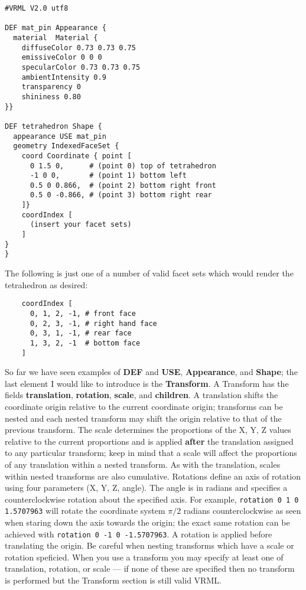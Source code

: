 \documentclass[a4paper]{article}
\begin{document}
\begin{verbatim}
#VRML V2.0 utf8

DEF mat_pin Appearance {
  material  Material {
    diffuseColor 0.73 0.73 0.75
    emissiveColor 0 0 0
    specularColor 0.73 0.73 0.75
    ambientIntensity 0.9
    transparency 0
    shininess 0.80
}}

DEF tetrahedron Shape {
  appearance USE mat_pin
  geometry IndexedFaceSet {
    coord Coordinate { point [
      0 1.5 0,      # (point 0) top of tetrahedron
      -1 0 0,       # (point 1) bottom left
      0.5 0 0.866,  # (point 2) bottom right front
      0.5 0 -0.866, # (point 3) bottom right rear
    ]}
    coordIndex [
      (insert your facet sets)
    ]
}
}
\end{verbatim}

The following is just one of a number of valid facet sets which would render the tetrahedron as desired:

\begin{verbatim}
    coordIndex [
      0, 1, 2, -1, # front face
      0, 2, 3, -1, # right hand face
      0, 3, 1, -1, # rear face
      1, 3, 2, -1  # bottom face
    ]
\end{verbatim}

So far we have seen examples of \textbf{DEF} and \textbf{USE}, \textbf{Appearance}, and \textbf{Shape};
the last element I would like to introduce is the \textbf{Transform}. A Transform has the fields
\textbf{translation}, \textbf{rotation}, \textbf{scale}, and \textbf{children}.  A translation shifts
the coordinate origin relative to the current coordinate origin; transforms can be nested and each
nested transform may shift the origin relative to that of the previous transform.  The scale determines
the proportions of the X, Y, Z values relative to the current proportions and is applied \textbf{after}
the translation assigned to any particular transform; keep in mind that a scale will affect the
proportions of any translation within a nested transform. As with the translation, scales within nested
transforms are also cumulative. Rotations
define an axis of rotation using four parameters (X, Y, Z, angle). The angle is in radians and specifies
a counterclockwise rotation about the specified axis. For example, \verb~rotation 0 1 0 1.5707963~ will
rotate the coordinate system $\pi/2$ radians counterclockwise as seen when staring down the axis towards
the origin; the exact same rotation can be achieved with \verb~rotation 0 -1 0 -1.5707963~. 
A rotation is applied before translating the origin. Be careful when nesting transforms which have
a scale or rotation speficied.  When you use a transform you may specify at least one of translation,
rotation, or scale --- if none of these are specified then no transform is performed but the Transform
section is still valid VRML.
\end{document}
